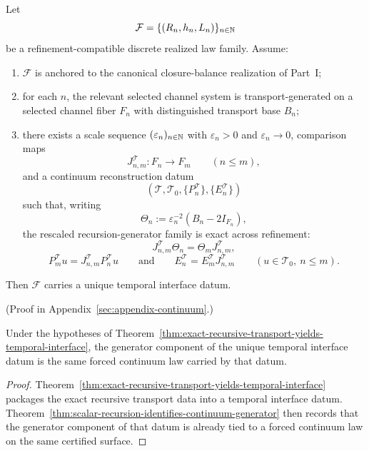 \begin{theorem}
\label{thm:exact-recursive-transport-yields-temporal-interface}
Let
\[
\mathcal F=\{(R_n,h_n,L_n)\}_{n\in\mathbb{N}}
\]
be a refinement-compatible discrete realized law family. Assume:
\begin{enumerate}[label=(\roman*), leftmargin=2em, itemsep=0.2em]
\item \(\mathcal F\) is anchored to the canonical closure-balance realization
      of Part~I;
\item for each \(n\), the relevant selected channel system is
      transport-generated on a selected channel fiber \(F_n\) with
      distinguished transport base \(B_n\);
\item there exists a scale sequence \((\varepsilon_n)_{n\in\mathbb{N}}\) with
      \(\varepsilon_n>0\) and \(\varepsilon_n\to0\), comparison maps
      \[
      J^{\mathcal T}_{n,m}:F_n\to F_m
      \qquad (n\le m),
      \]
      and a continuum reconstruction datum
      \[
      (\mathcal T,\mathcal T_0,\{P_n^{\mathcal T}\},\{E_n^{\mathcal T}\})
      \]
      such that, writing
      \[
      \Theta_n:=\varepsilon_n^{-2}(B_n-2I_{F_n}),
      \]
      the rescaled recursion-generator family is exact across refinement:
      \[
      J^{\mathcal T}_{n,m}\Theta_n=\Theta_mJ^{\mathcal T}_{n,m},
      \]
      \[
      P_m^{\mathcal T}u=J^{\mathcal T}_{n,m}P_n^{\mathcal T}u
      \qquad\text{and}\qquad
      E_n^{\mathcal T}=E_m^{\mathcal T}J^{\mathcal T}_{n,m}
      \qquad (u\in\mathcal T_0,\ n\le m).
      \]
\end{enumerate}
Then \(\mathcal F\) carries a unique temporal interface datum.
\end{theorem}

(Proof in Appendix~\ref{sec:appendix-continuum}.)

\begin{corollary}
\label{cor:exact-recursive-transport-forces-graph-temporal-generator}
Under the hypotheses of
Theorem~\ref{thm:exact-recursive-transport-yields-temporal-interface}, the
generator component of the unique temporal interface datum is the same forced
continuum law carried by that datum.
\end{corollary}

\begin{proof}
Theorem~\ref{thm:exact-recursive-transport-yields-temporal-interface}
packages the exact recursive transport data into a temporal interface datum.
Theorem~\ref{thm:scalar-recursion-identifies-continuum-generator} then records
that the generator component of that datum is already tied to a forced
continuum law on the same certified surface.
\end{proof}

